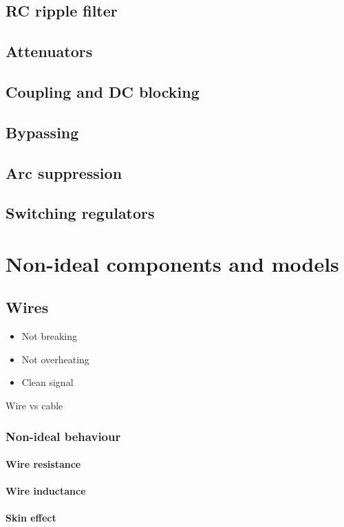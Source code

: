 \documentclass{report}
\begin{document}
\section{RC ripple filter}
\section{Attenuators}
\section{Coupling and DC blocking}
\section{Bypassing}
\section{Arc suppression}
\section{Switching regulators}


\chapter{Non-ideal components and models}
\section{Wires}
\begin{itemize}
\item Not breaking
\item Not overheating
\item Clean signal
\end{itemize}
Wire vs cable
\subsection{Non-ideal behaviour}
\subsubsection{Wire resistance}
\subsubsection{Wire inductance}
\subsubsection{Skin effect}
\end{document}
